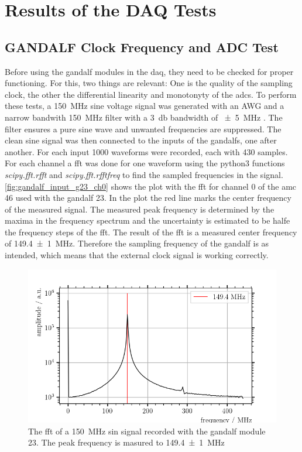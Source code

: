 \chapter{Results of the DAQ Tests}


\section{GANDALF Clock Frequency and ADC Test}
Before using the \ac{gandalf} modules in the \ac{daq}, they need to be checked for proper functioning.
For this, two things are relevant:
One is the quality of the sampling clock, the other the differential linearity and monotonyty of the \acp{adc}.
To perform these tests, a \SI{150}{\mega\hertz} sine voltage signal was generated with an AWG and a narrow bandwith \SI{150}{\mega\hertz} filter with a \SI{3}{\decibel} bandwidth of \SI{+-5}{\mega\hertz} \cite{}.
The filter ensures a pure sine wave and unwanted frequencies are suppressed.
The clean sine signal was then connected to the inputs of the \acp{gandalf}, one after another.
For each input \num{1000} waveforms were recorded, each with 430 samples.
For each channel a \ac{fft} was done for one waveform using the python3 functions \textit{scipy.fft.rfft} and \textit{scipy.fft.rfftfreq} to find the sampled frequencies in the signal.
\autoref{fig:gandalf_input_g23_ch0} shows the plot with the \ac{fft} for channel 0 of the \ac{amc} 46 used with the \ac{gandalf} 23.
In the plot the red line marks the center frequency of the measured signal.
The measured peak frequency is determined by the maxima in the frequency spectrum and the uncertainty is estimated to be halfe the frequency steps of the \ac{fft}.
The result of the \ac{fft} is a measured center frequency of \SI{149.4(10)}{\mega\hertz}.
Therefore the sampling frequency of the \ac{gandalf} is as intended, which means that the external clock signal is working correctly.
\begin{figure}
	\centering
	\includegraphics[width=1.\textwidth]{pictures/gandalf_23_input_ch0}
	\caption[FFT of a \SI{150}{\mega\hertz} sin signal recorded with a GANDALF module.]{The \ac{fft} of a \SI{150}{\mega\hertz} sin signal recorded with the \ac{gandalf} module 23. The peak frequency is masured to \SI{149.4(10)}{\mega\hertz}}
	\label{fig:input_offset_b2_ch0}
\end{figure}


